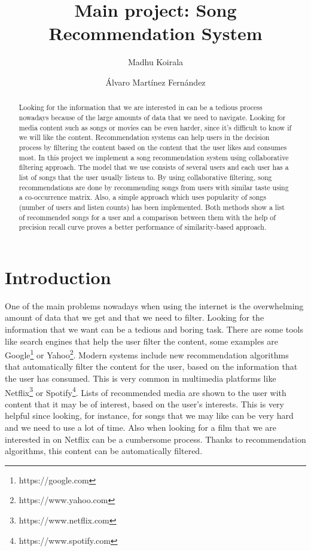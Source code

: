 \documentclass{jot}
\title{Main project: Song Recommendation System}
\author[affiliation=UiT, nowrap]
    {Madhu Koirala}
    {is a master student in Computer Science at the University of Troms\o. You can contact him at \email{mko075@uit.no}.}
\author[affiliation=UiT, nowrap]
    {\'{A}lvaro Mart\'{i}nez Fern\'{a}ndez}
    { is a master student in Computer Science at the University of Troms\o. You can contact him at \email{afe026@uit.no}.}
\affiliation{UiT}{University of Troms\o, Norway\\
\url{https://uit.no/startsida}}
\begin{document}
\begin{abstract}
Looking for the information that we are interested in can be a tedious process nowadays because of the large amounts of data that we need to navigate. Looking for media content such as songs or movies can be even harder, since it’s difficult to know if we will like the content. Recommendation systems can help users in the decision process by filtering the content based on the content that the user likes and consumes most. In this project we implement a song recommendation system using collaborative filtering approach. The model that we use consists of several users and each user has a list of songs that the user usually listens to. By using collaborative filtering, song recommendations are done by recommending songs from users with similar taste using a co-occurrence matrix. Also, a simple approach which uses popularity of songs (number of users and listen counts) has been implemented. Both methods show a list of recommended songs for a user and a comparison between them with the help of precision recall curve proves a better performance of similarity-based approach.
\end{abstract}


\tableofcontents

\section{Introduction}
One of the main problems nowadays when using the internet is the overwhelming amount of data that we get and that we need to filter. Looking for the information that we want can be a tedious and boring task. There are some tools like search engines that help the user filter the content, some examples are Google\footnote{https://google.com} or Yahoo\footnote{https://www.yahoo.com}. Modern systems include new recommendation algorithms that automatically filter the content for the user, based on the information that the user has consumed. This is very common in multimedia platforms like Netflix\footnote{https://www.netflix.com} or Spotify\footnote{https://www.spotify.com}. Lists of recommended media are shown to the user with content that it may be of interest, based on the user’s interests. This is very helpful since looking, for instance, for songs that we may like can be very hard and we need to use a lot of time. Also when looking for a film that we are interested in on Netflix can be a cumbersome process. Thanks to recommendation algorithms, this content can be automatically filtered.
\end{document}
